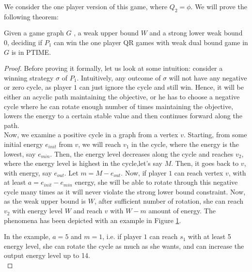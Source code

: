 We consider the one player version of this game, where $Q_2= \phi$. We will prove the following theorem:\\

\begin{theorem}
\label{one-player-weak-thm}
Given a game graph $G$ , a weak upper bound $W$ and a strong lower weak bound $0$, deciding if $P_1$ can win the one player QR games with weak dual bound game in $G$ is in PTIME.
\end{theorem}

\begin{proof}
  Before proving it formally, let us look at some intuition: consider a winning strategy $\sigma$ of $P_1$. Intuitively, any outcome of $\sigma$ will not have any negative or zero cycle, as player $1$ can just ignore the cycle and still win. Hence, it will be either an acyclic path maintaining the objective, or he has to choose a negative cycle where he can rotate enough number of times maintaining the objective, lowers the energy to a certain stable value and then continues forward along the path.\\
  \vskip 0.2cm
  Now, we examine a positive cycle in a graph from a vertex $v$. Starting, from some initial energy $e_{init}$ from $v$, we will reach $v_1$ in the cycle, where the energy is the lowest, say $e_{min}$. Then, the energy level decreases along the cycle and reaches $v_2$, where the energy level is highest in the cycle,let's say $M$. Then, it goes back to $v$, with energy, say $e_{out}$. Let $m=M - e_{out}$. Now, if player $1$ can reach vertex $v$, with at least $a= e_{init} - e_{min}$ energy, she will be able to rotate through this negative cycle many times as it will never violate the strong lower bound constraint. Now, as the weak upper bound is $W$, after sufficient number of rotation, she can reach $v_2$ with energy level $W$ and reach $v$ with $W-m$ amount of energy. The phenomena has been depicted with an example in Figure \ref{energy-positivecycle}.\\
  
  \begin{figure}[htb]
  \label{energy-positivecycle}
  
  \end{figure}
  \vskip 0.1cm
  In the example, $a=5$ and $m=1$, i.e. if player $1$ can reach $s_1$ with at least 5 energy level, she can rotate the cycle as much as she wants, and can increase the output energy level up to 14.\\
  

\end{proof}
